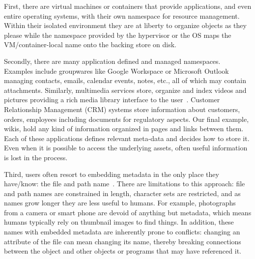 First, there are virtual machines or containers that provide applications, and even entire operating systems, with their own namespace for resource management.
Within their isolated environment they are at liberty to organize objects as they please while the namespace provided by the hypervisor or the OS maps the VM/container-local name onto the backing store on disk. 

Secondly, there are many application defined and managed namespaces.
Examples include groupwares like Google Workspace or Microsoft Outlook managing contacts, emails, calendar events, notes, etc., all of which may contain attachments. 
Similarly, multimedia services store, organize and index videos and pictures providing a rich media library interface to the user~\cite{orr2020sample}.
Customer Relationship Management (CRM) systems store information about customers, orders, employees including documents for regulatory aspects.
Our final example, wikis, hold any kind of information organized in pages and links between them. 
Each of these applications defines relevant meta-data and decides how to store it.
Even when it is possible to access the underlying assets, often useful information is lost in the process.

Third, users often resort to embedding metadata in the only place they have/know: the file and path name~\cite{9229638, guo2012burrito}.
There are limitations to this approach: file and path names are constrained in length, character sets are restricted, and as names grow longer they are less useful to humans.  
For example, photographs from a camera or smart
phone are devoid of anything but metadata, which means humans typically rely on thumbnail images to find things.  In addition, these names with embedded metadata are inherently prone to conflicts: changing an attribute of the file can mean changing its name, thereby breaking connections between the object and other objects or programs that may have referenced it.

